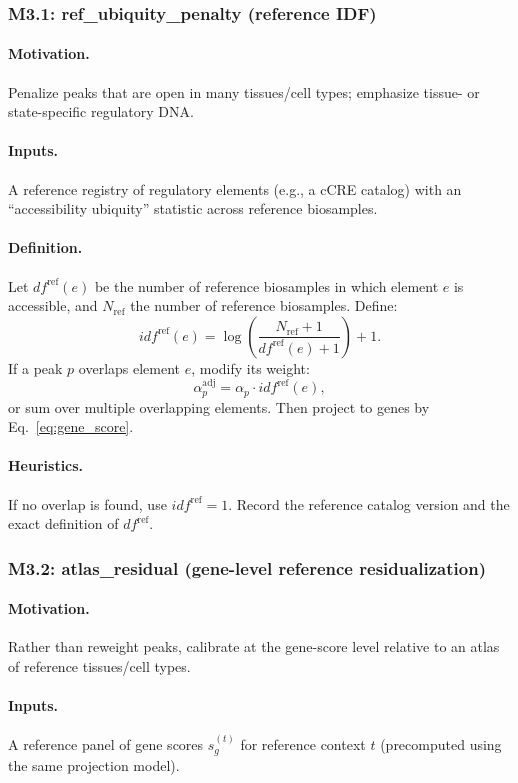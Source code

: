 \documentclass[11pt]{article}
\begin{document}
\subsubsection{M3.1: ref\_ubiquity\_penalty (reference IDF)}
\paragraph{Motivation.} Penalize peaks that are open in many tissues/cell types; emphasize tissue- or state-specific regulatory DNA.
\paragraph{Inputs.} A reference registry of regulatory elements (e.g., a cCRE catalog) with an ``accessibility ubiquity'' statistic across reference biosamples.
\paragraph{Definition.} Let $df^{\mathrm{ref}}(e)$ be the number of reference biosamples in which element $e$ is accessible, and $N_{\mathrm{ref}}$ the number of reference biosamples. Define:
\[
idf^{\mathrm{ref}}(e) = \log\left(\frac{N_{\mathrm{ref}}+1}{df^{\mathrm{ref}}(e)+1}\right) + 1.
\]
If a peak $p$ overlaps element $e$, modify its weight:
\begin{equation}
\alpha_p^{\mathrm{adj}} = \alpha_p \cdot idf^{\mathrm{ref}}(e),
\label{eq:ref_idf}
\end{equation}
or sum over multiple overlapping elements.
Then project to genes by Eq.\ \ref{eq:gene_score}.
\paragraph{Heuristics.} If no overlap is found, use $idf^{\mathrm{ref}}=1$.
Record the reference catalog version and the exact definition of $df^{\mathrm{ref}}$.

\subsubsection{M3.2: atlas\_residual (gene-level reference residualization)}
\paragraph{Motivation.} Rather than reweight peaks, calibrate at the gene-score level relative to an atlas of reference tissues/cell types.
\paragraph{Inputs.} A reference panel of gene scores $s_g^{(t)}$ for reference context $t$ (precomputed using the same projection model).
\end{document}

